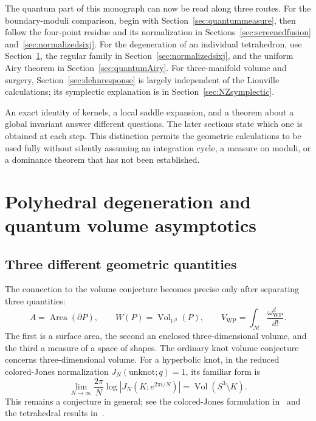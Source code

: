 \documentclass[11pt,a4paper]{article}
\numberwithin{equation}{section}
\theoremstyle{definition}
\theoremstyle{remark}
\newcommand{\WP}{\mathrm{WP}}
\newcommand{\M}{\mathcal M}
\newcommand{\HH}{\mathbb H}
\begin{document}
The quantum part of this monograph can now be read along three routes.
For the boundary-moduli comparison, begin with
Section~\ref{sec:quantummeasure}, then follow the four-point residue
and its normalization in Sections~\ref{sec:screenedfusion}
and~\ref{sec:normalizedsixj}. For the degeneration of an individual
tetrahedron, use Section~\ref{sec:quantumdegeneration}, the regular
family in Section~\ref{sec:normalizedsixj}, and the uniform Airy
theorem in Section~\ref{sec:quantumAiry}. For three-manifold volume
and surgery, Section~\ref{sec:dehnresponse} is largely independent
of the Liouville calculations; its symplectic explanation is in
Section~\ref{sec:NZsymplectic}.

An exact identity of kernels, a local saddle expansion, and a
theorem about a global invariant answer different questions. The
later sections state which one is obtained at each step. This
distinction permits the geometric calculations to be used fully
without silently assuming an integration cycle, a measure on
moduli, or a dominance theorem that has not been established.


\section{Polyhedral degeneration and quantum volume asymptotics}
\label{sec:quantumdegeneration}

\subsection{Three different geometric quantities}

The connection to the volume conjecture becomes precise only after
separating three quantities:
\[
 A=\operatorname{Area}(\partial P),\qquad
 W(P)=\operatorname{Vol}_{\HH^3}(P),\qquad
 V_{\WP}=\int_{\M}\frac{\omega_{\WP}^d}{d!}.
\]
The first is a surface area, the second an enclosed three-dimensional
volume, and the third a measure of a space of shapes. The ordinary
knot volume conjecture concerns three-dimensional volume. For a
hyperbolic knot, in the reduced colored-Jones normalization
$J_N(\text{unknot};q)=1$, its familiar form is
\begin{equation}
 \lim_{N\to\infty}\frac{2\pi}{N}
 \log\left|J_N(K;e^{2\pi i/N})\right|
 =\operatorname{Vol}(S^3\setminus K).
 \label{eq:volumeconjecture}
\end{equation}
This remains a conjecture in general; see the colored-Jones
formulation in~\cite{MurakamiMurakami} and the tetrahedral
results in~\cite{Costantino}.
\end{document}
